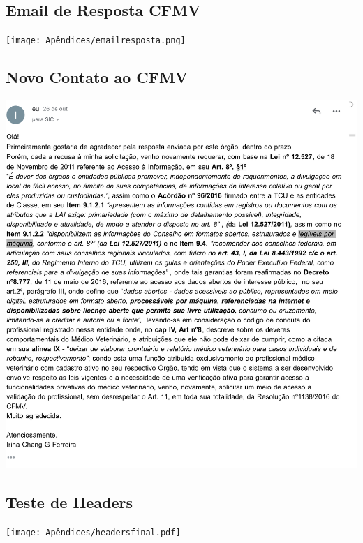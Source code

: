\documentclass[
    12pt,               %
    openright,          %
    oneside,
    a4paper,            %
    BIBLATEX,           %
    TODO,               %
    english,            %
    brazil              %
    ]{ifsp-spo-inf-ctds}
\begin{document}
\begin{apendicesenv}
\begin {appendices}
\chapter{Email de Resposta CFMV}
\texttt{[image: Apêndices/emailresposta.png]}

\newpage
\label{apendiceB}
\end{appendices}
\newpage

\begin {appendices}
\chapter{Novo Contato ao CFMV}


\includegraphics[page=1, width=1\linewidth,height=0.8\textheight]{Apêndices/email2.png}

\label{apendiceC}
\end{appendices}

\begin {appendices}
\chapter{Teste de Headers}
\texttt{[image: Apêndices/headersfinal.pdf]}
\label{apendiceD}
\end{appendices}


\end{apendicesenv}
\end{document}
